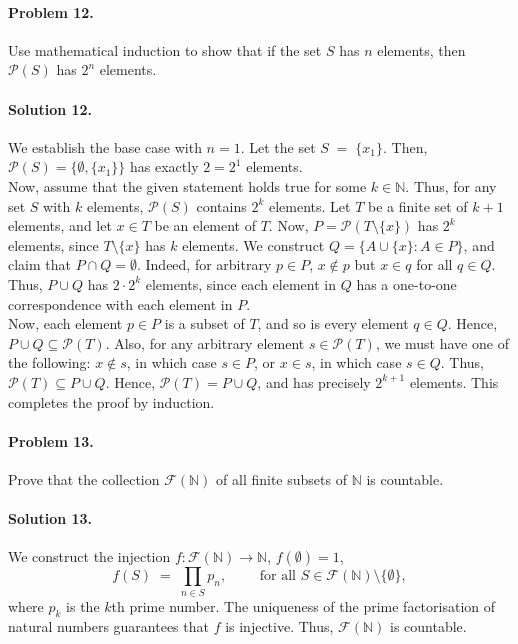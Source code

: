 \documentclass[10pt]{article}
\begin{document}
        \paragraph{Problem 12.} Use mathematical induction to show that if the set $S$ has $n$ elements, then $\mathcal{P}(S)$ has $2^n$ elements.
        \paragraph{Solution 12.} We establish the base case with $n = 1$. Let the set $S \;=\; \{x_1\}$. Then, 
        $\mathcal{P}(S) = \{\emptyset, \{x_1\}\}$ has exactly $2 = 2^1$ elements.\\

        Now, assume that the given statement holds true for some $k \in \mathbb{N}$. Thus, for any set $S$ with $k$ elements,
        $\mathcal{P}(S)$ contains $2^k$ elements. Let $T$ be a finite set of $k + 1$ elements, and let $x \in T$ be an element of $T$.
        Now, $P = \mathcal{P}(T\setminus\{x\})$ has $2^k$ elements, since $T\setminus\{x\}$ has $k$ elements.
        We construct $Q = \{A \cup \{x\}: A \in P\}$, and claim that $P \cap Q = \emptyset$. Indeed, for arbitrary $p \in P$, 
        $x\notin p$ but $x \in q$ for all $q \in Q$. Thus, $P \cup Q$ has $2\cdot 2^k$ elements, since each element in $Q$ has a one-to-one
        correspondence with each element in $P$.\\

        Now, each element $p \in P$ is a subset of $T$, and so is every element $q \in Q$. Hence, $P\cup Q \subseteq \mathcal{P}(T)$.
        Also, for any arbitrary element $s \in \mathcal{P}(T)$, we must have one of the following: $x \notin s$, in which case
        $s \in P$, or $x \in s$, in which case $s \in Q$. Thus, $\mathcal{P}(T) \subseteq P \cup Q$. Hence, 
        $\mathcal{P}(T) = P \cup Q$, and has precisely $2^{k + 1}$ elements. This completes the proof by induction.

        \paragraph{Problem 13.} Prove that the collection $\mathcal{F}(\mathbb{N})$ of all finite subsets of $\mathbb{N}$ is countable.
        \paragraph{Solution 13.} We construct the injection $f\colon \mathcal{F}(\mathbb{N}) \to \mathbb{N}$, $f(\emptyset) = 1$,
        \[
                f(S) \;=\; \prod_{n \in S} p_n, \quad\quad\text{ for all } S \in \mathcal{F}(\mathbb{N})\setminus\{\emptyset\},
        \]
        where $p_k$ is the $k$th prime number. The uniqueness of the prime factorisation of natural numbers guarantees that 
        $f$ is injective.
        Thus, $\mathcal{F}(\mathbb{N})$  is countable. \\
\end{document}
